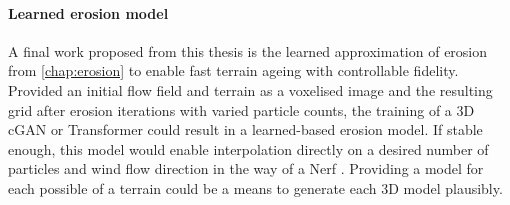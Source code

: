 \paragraph{Learned erosion model} A final work proposed from this thesis is the learned approximation of erosion from \cref{chap:erosion} to enable fast terrain ageing with controllable fidelity. Provided an initial flow field \cite{Tompson2017} and terrain as a voxelised image and the resulting grid after erosion iterations with varied particle counts, the training of a 3D cGAN \cite{Ongun2018} or Transformer \cite{Vaswani2017} could result in a learned-based erosion model. If stable enough, this model would enable interpolation directly on a desired number of particles and wind flow direction in the way of a Nerf \cite{Mildenhall2020}. Providing a model for each possible  of a terrain could be a means to generate each 3D model plausibly.








